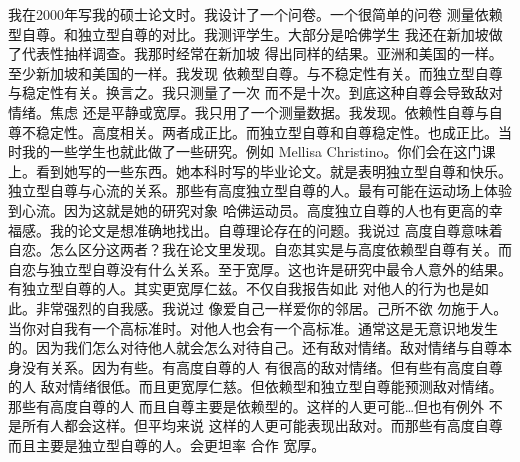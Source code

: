 我在2000年写我的硕士论文时。我设计了一个问卷。一个很简单的问卷 测量依赖型自尊。和独立型自尊的对比。我测评学生。大部分是哈佛学生 我还在新加坡做了代表性抽样调查。我那时经常在新加坡 得出同样的结果。亚洲和美国的一样。至少新加坡和美国的一样。我发现 依赖型自尊。与不稳定性有关。而独立型自尊与稳定性有关。换言之。我只测量了一次 而不是十次。到底这种自尊会导致敌对情绪。焦虑 还是平静或宽厚。我只用了一个测量数据。我发现。依赖性自尊与自尊不稳定性。高度相关。两者成正比。而独立型自尊和自尊稳定性。也成正比。当时我的一些学生也就此做了一些研究。例如 Mellisa Christino。你们会在这门课上。看到她写的一些东西。她本科时写的毕业论文。就是表明独立型自尊和快乐。独立型自尊与心流的关系。那些有高度独立型自尊的人。最有可能在运动场上体验到心流。因为这就是她的研究对象 哈佛运动员。高度独立自尊的人也有更高的幸福感。我的论文是想准确地找出。自尊理论存在的问题。我说过 高度自尊意味着自恋。怎么区分这两者？我在论文里发现。自恋其实是与高度依赖型自尊有关。而自恋与独立型自尊没有什么关系。至于宽厚。这也许是研究中最令人意外的结果。有独立型自尊的人。其实更宽厚仁兹。不仅自我报告如此 对他人的行为也是如此。非常强烈的自我感。我说过 像爱自己一样爱你的邻居。己所不欲 勿施于人。当你对自我有一个高标准时。对他人也会有一个高标准。通常这是无意识地发生的。因为我们怎么对待他人就会怎么对待自己。还有敌对情绪。敌对情绪与自尊本身没有关系。因为有些。有高度自尊的人 有很高的敌对情绪。但有些有高度自尊的人 敌对情绪很低。而且更宽厚仁慈。但依赖型和独立型自尊能预测敌对情绪。那些有高度自尊的人 而且自尊主要是依赖型的。这样的人更可能…但也有例外 不是所有人都会这样。但平均来说 这样的人更可能表现出敌对。而那些有高度自尊 而且主要是独立型自尊的人。会更坦率 合作 宽厚。 

